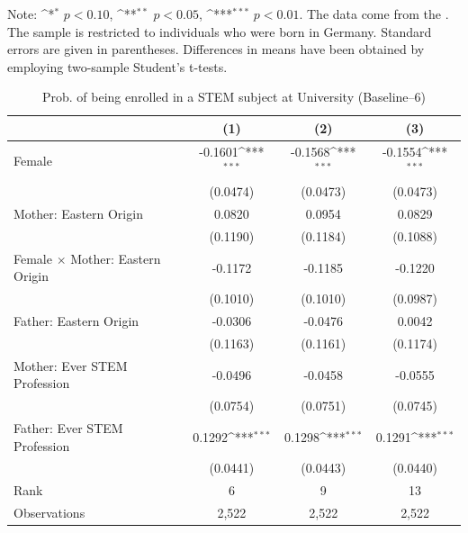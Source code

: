 \documentclass[a4paper, oneside, hyperfootnotes = false]{article}
\def\sym#1{\ifmmode^{#1}\else\(^{#1}\)\fi}
\begin{document}
{\begin{table}[ht]
\begin{center}
		\vspace{2mm}
		
		\parbox{10cm}{
			\linespread{1}\footnotesize Note: \sym{*} \(p<0.10\), \sym{**} \(p<0.05\), \sym{***} \(p<0.01\). The data come from the \cite{SOEP2023}. The sample is restricted to individuals who were born in Germany. Standard errors are given in parentheses. Differences in means have been obtained by employing two-sample Student's t-tests.}
		
	\end{center}
\end{table}

\begin{table}[ht]
	\caption[STEM subject at University (Baseline--6)]{Prob. of being enrolled in a STEM subject at University (Baseline--6)}
	\label{tab:baseline--6}
	\begin{center}
		\begin{tabular}{l*{3}{c}}
			\toprule
			&\multicolumn{1}{c}{(1)}         &\multicolumn{1}{c}{(2)}         &\multicolumn{1}{c}{(3)}         \\
			\midrule
			Female              &     -0.1601\sym{***}&     -0.1568\sym{***}&     -0.1554\sym{***}\\
			&    (0.0474)         &    (0.0473)         &    (0.0473)         \\
			\addlinespace
			Mother: Eastern Origin&      0.0820         &      0.0954         &      0.0829         \\
			&    (0.1190)         &    (0.1184)         &    (0.1088)         \\
			\addlinespace
			Female $\times$ Mother: Eastern Origin&     -0.1172         &     -0.1185         &     -0.1220         \\
			&    (0.1010)         &    (0.1010)         &    (0.0987)         \\
			\addlinespace
			Father: Eastern Origin&     -0.0306         &     -0.0476         &      0.0042         \\
			&    (0.1163)         &    (0.1161)         &    (0.1174)         \\
			\addlinespace
			Mother: Ever STEM Profession&     -0.0496         &     -0.0458         &     -0.0555         \\
			&    (0.0754)         &    (0.0751)         &    (0.0745)         \\
			\addlinespace
			Father: Ever STEM Profession&      0.1292\sym{***}&      0.1298\sym{***}&      0.1291\sym{***}\\
			&    (0.0441)         &    (0.0443)         &    (0.0440)         \\
			\midrule
			Rank                &      6         &      9         &     13         \\
			Observations                   &   2,522         &   2,522         &   2,522         \\
			\bottomrule
		\end{tabular}
		

\end{center}
\end{table}}
\end{document}
